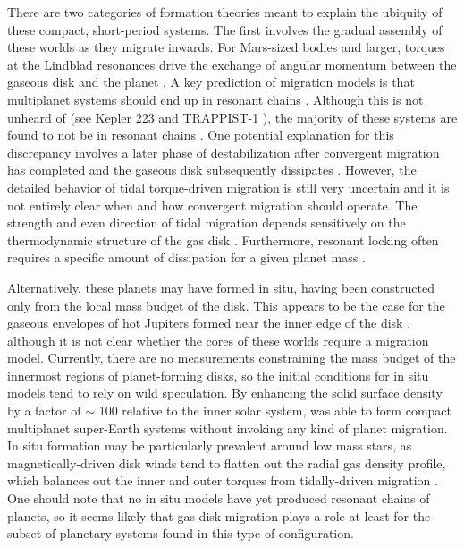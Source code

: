 There are two categories of formation theories meant to explain the ubiquity of these compact, short-period systems. The first 
involves the gradual assembly of these worlds as they migrate inwards. For Mars-sized bodies and larger, torques at the Lindblad 
resonances drive the exchange of angular momentum between the gaseous disk and the planet \cite{ward97}. A key prediction of 
migration models is that multiplanet systems should end up in resonant chains \cite{cresswell06}. Although this is not unheard of 
(see Kepler 223 \cite{mills16} and TRAPPIST-1 \cite{gillon16, gillon17, agol21}), the majority of these systems are found to not be in 
resonant chains \cite{lissauer11, fabrycky14}. One potential explanation for this discrepancy involves a later phase of 
destabilization after convergent migration has completed and the gaseous disk subsequently dissipates 
\cite{izidoro17, izidoro21}. However, the detailed behavior of tidal torque-driven migration is still very uncertain and it is not 
entirely clear when and how convergent migration should operate. The strength and even direction of tidal migration depends 
sensitively on the thermodynamic structure of the gas disk \cite{ayliffe10, bitsch13}. Furthermore, resonant locking often requires a specific amount of dissipation for a given planet mass \cite{batygin23}.

Alternatively, these planets may have formed in situ, having been constructed only from the local mass budget of the disk. This 
appears to be the case for the gaseous envelopes of hot Jupiters formed near the inner edge of the disk \cite{bailey18}, although 
it is not clear whether the cores of these worlds require a migration model. Currently, there are no measurements constraining the 
mass budget of the innermost regions of planet-forming disks, so the initial conditions for in situ models tend to rely on wild 
speculation. By enhancing the solid surface density by a factor of $\sim$ 100 relative to the inner solar system, \cite{hansen12} 
was able to form compact multiplanet super-Earth systems without invoking any kind of planet migration. In situ formation may be 
particularly prevalent around low mass stars, as magnetically-driven disk winds tend to flatten out the radial gas density profile, 
which balances out the inner and outer torques from tidally-driven migration \cite{ogihara18}. One should note that no in situ 
models have yet produced resonant chains of planets, so it seems likely that gas disk migration plays a role at least for the 
subset of planetary systems found in this type of configuration.

